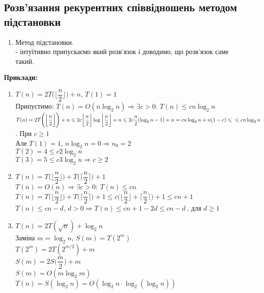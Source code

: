 \documentclass[a4paper,12pt]{article}
\begin{document}
\newpage
    \subsection{Розв'язання рекурентних співвідношень методом підстановки}
    \begin{enumerate}
        \item Метод підстановки. \\
        - інтуїтивно припускаємо який розв'язок і доводимо, що розв'язок саме такий. 
    \end{enumerate}
    \textbf{Приклади:}
    \begin{enumerate}
        \item $T(n)=2T\Biggl(\bigg\lfloor\dfrac{n}{2}\bigg\rfloor \Biggr)+n$, $T(1)=1$ \\
        Припустимо: $T(n)=O(n\log_2n)\Rightarrow \exists c>0$. $T(n)\leqslant cn\log_2n$ \\
        $T(n)=2T\Biggl(\bigg\lfloor\dfrac{n}{2}\bigg\rfloor \Biggr)+n\leqslant2c\bigg\lfloor\dfrac{n}{2}\bigg\rfloor\log\bigg\lfloor\dfrac{n}{2}\bigg\rfloor+n\leqslant
        2c\dfrac{n}{2}(\log_2n-1)+n=cn\log_2n+n(1-c)\leqslant \\ \leqslant cn\log_2n$. При $c\geqslant1$ \\
        Але $T(1)=1$, $n\log_2n=0\Rightarrow n_0=2$ \\
        $T(2)=4\leqslant c2\log_2n$ \\
        $T(3)=5\leqslant c3\log_2n \Rightarrow c\geqslant2$
        \item $T(n)=T\Biggl(\bigg\lfloor\dfrac{n}{2}\bigg\rfloor\Biggr)+T\Biggl(\bigg\lceil\dfrac{n}{2}\bigg\rceil \Biggr)+1$ \\
        $T(n)=O(n)\Rightarrow \exists c>0:\:T(n)\leqslant cn$ \\
        $T(n)=T\Biggl(\bigg\lfloor\dfrac{n}{2}\bigg\rfloor\Biggr)+T\Biggl(\bigg\lceil\dfrac{n}{2}\bigg\rceil \Biggr)+1\leqslant
        c\Biggl(\bigg\lfloor\dfrac{n}{2}\bigg\rfloor+\bigg\lceil\dfrac{n}{2}\bigg\rceil\Biggr)+1\leqslant cn+1$ \\
        $T(n)\leqslant cn-d$, $d>0\Rightarrow T(n)\leqslant cn+1-2d\leqslant cn-d\:$, для $d\geqslant1$
        \item $T(n)=2T(\sqrt{n})+\log_2n$ \\
        Заміна $m=\log_2n$, $S(m)=T(2^m)$ \\
        $T(2^m)=2T(2^{m/2})+m$ \\
        $S(m)=2S\Biggl(\dfrac{m}{2}\Biggr)+m$ \\
        $S(m)=O(m\log_2m)$ \\
        $T(n)=S(\log_2n)=O(\log_2n\cdot\log_2(\log_2n))$
    \end{enumerate}
\end{document}

